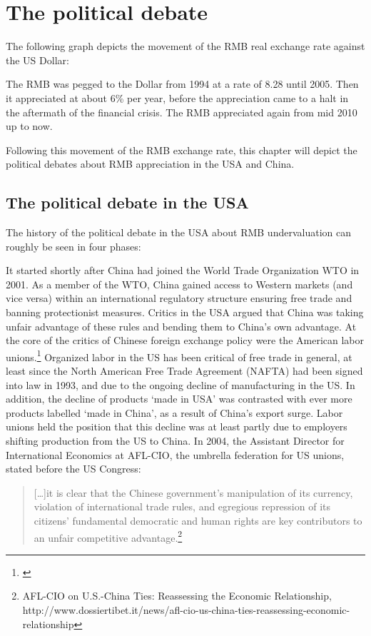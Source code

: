 
\section{The political debate}

The following graph depicts the movement of the RMB real exchange rate against the US Dollar:


The RMB was pegged to the Dollar from 1994 at a rate of 8.28 until 2005. Then it appreciated at about 6\% per year, before the appreciation came to a halt in the aftermath of the financial crisis. The RMB appreciated again from mid 2010 up to now.

Following this movement of the RMB exchange rate, this chapter will depict the political debates about RMB appreciation in the USA and China.


\subsection{The political debate in the USA}

The history of the political debate in the USA about RMB undervaluation can roughly be seen in four phases:

It started shortly after China had joined the World Trade Organization WTO in 2001. As a member of the WTO, China gained access to Western markets (and vice versa) within an international regulatory structure ensuring free trade and banning protectionist measures. Critics in the USA argued that China was taking unfair advantage of these rules and bending them to China's own advantage. At the core of the critics of Chinese foreign exchange policy were the American labor unions.\footnote{\cite[pp. 14]{Levy2011}} Organized labor in the US has been critical of free trade in general, at least since the North American Free Trade Agreement (NAFTA) had been signed into law in 1993, and due to the ongoing decline of manufacturing in the US. In addition, the decline of products `made in USA'  was contrasted with ever more products labelled `made in China', as a result of China's export surge. Labor unions held the position that this decline was at least partly due to employers shifting production from the US to China. In 2004, the Assistant Director for International Economics at AFL-CIO, the umbrella federation for US unions, stated before the US Congress: 

\begin{quote}
[\dots]it is clear that the Chinese government’s manipulation of its currency, violation of international trade rules, and egregious repression of its citizens’ fundamental democratic and human rights are key contributors to an unfair competitive advantage.\footnote{AFL-CIO on U.S.-China Ties: Reassessing the Economic Relationship, http://www.dossiertibet.it/news/afl-cio-us-china-ties-reassessing-economic-relationship}
\end{quote}

